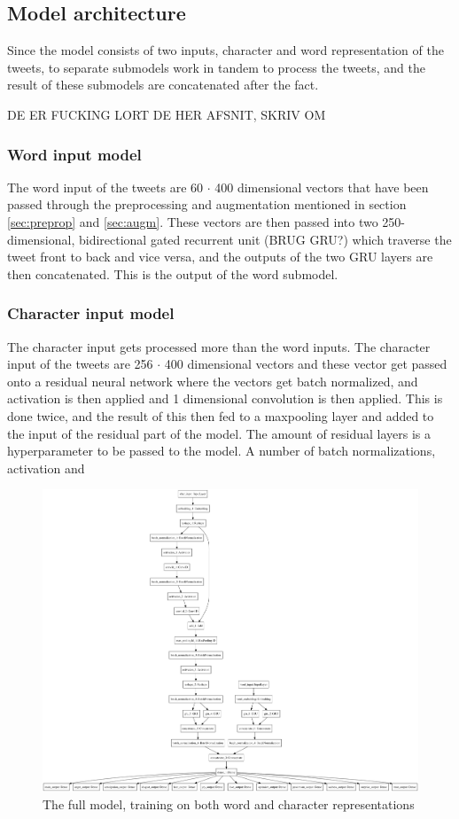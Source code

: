\subsection{Model architecture}
Since the model consists of two inputs, character and word representation of the tweets, to separate submodels work in tandem to process the tweets, and the result of these submodels are concatenated after the fact.

DE ER FUCKING LORT DE HER AFSNIT, SKRIV OM

\subsubsection*{Word input model}
The word input of the tweets are 60 $\cdot$ 400 dimensional vectors that have been passed through the preprocessing and augmentation mentioned in section \ref{sec:preprop} and \ref{sec:augm}. These vectors are then passed into two 250-dimensional, bidirectional gated recurrent unit (BRUG GRU?) which traverse the tweet front to back and vice versa, and the outputs of the two GRU layers are then concatenated. This is the output of the word submodel.

\subsubsection*{Character input model}
The character input gets processed more than the word inputs. The character input of the tweets are 256 $\cdot$ 400 dimensional vectors and these vector get passed onto a residual neural network where the vectors get batch normalized, and activation is then applied and 1 dimensional convolution is then applied. This is done twice, and the result of this then fed to a maxpooling layer and added to the input of the residual part of the model. The amount of residual layers is a hyperparameter to be passed to the model. A number of batch normalizations, activation and

\begin{figure}[H]
    \centering
        \includegraphics[width=\textwidth]{pictures/model.png}
        \caption{The full model, training on both word and character representations}
        \label{fig:fullmodel}
\end{figure}
